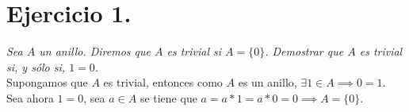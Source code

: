 \section{Ejercicio 1.} \emph{Sea \(A\) un anillo. Diremos que \(A\) es trivial si
  \(A = \{0\}\). Demostrar que \(A\) es trivial si, y sólo si, \(1 = 0\).}\\

Supongamos que \(A\) es trivial, entonces como \(A\) es un anillo, \(\exists 1
\in A \implies 0 = 1\). Sea ahora \(1 = 0\), sea \(a \in A\) se tiene que \(a =
a*1 = a*0 = 0 \implies A = \{0\}\).
